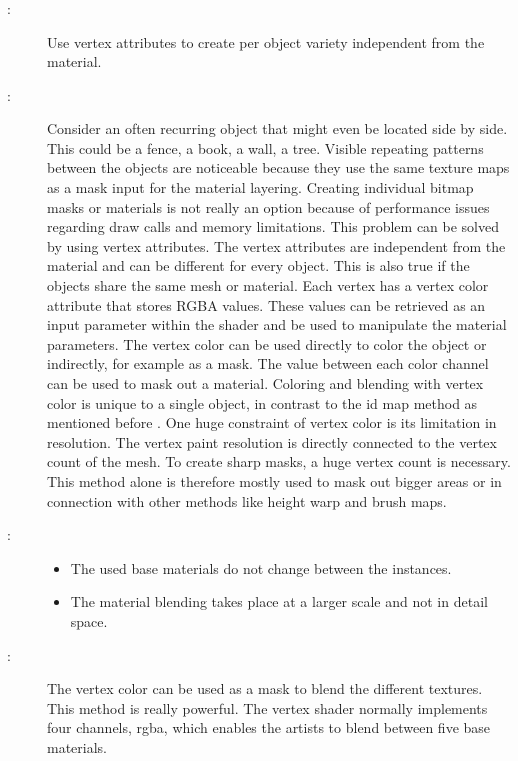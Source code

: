 \subsubsection{\patMeshVertexColor}\label{\patMeshVertexColor}
\begin{description}
	\item[\patIntent:]%
	Use vertex attributes to create per object variety independent from the material.
	\item[\patMotivation:]%
	Consider an often recurring object that might even be located side by side. This could be a fence, a book, a wall, a tree. Visible repeating patterns between the objects are noticeable because they use the same texture maps as a mask input for the material layering. Creating individual bitmap masks or materials is not really an option because of performance issues regarding draw calls and memory limitations. 
	This problem can be solved by using vertex attributes. The vertex attributes are independent from the material and can be different for every object. This is also true if the objects share the same mesh or material. Each vertex has a vertex color attribute that stores RGBA values. These values can be retrieved as an input parameter within the shader and be used to manipulate the material parameters. The vertex color can be used directly to color the object or indirectly, for example as a mask. The value between each color channel can be used to mask out a material.	Coloring and blending with vertex color is unique to a single object, in contrast to the id map method as mentioned before \cite{epic2018assetVsInstance}. One huge constraint of vertex color is its limitation in resolution. The vertex paint resolution is directly connected to the vertex count of the mesh. To create sharp masks, a huge vertex count is necessary. This method alone is therefore mostly used to mask out bigger areas or in connection with other methods like height warp and brush maps.
	\item[\patApplicability:]\hfill 
	\begin{itemize}\mynobreakpar
		\item The used base materials do not change between the instances. 
		\item The material blending takes place at a larger scale and not in detail space. 
	\end{itemize}
	\item[\patImplementation:]%
	The vertex color can be used as a mask to blend the different textures. This method is really powerful. The vertex shader normally implements four channels, rgba, which enables the artists to blend between five base materials. 

\end{description}
